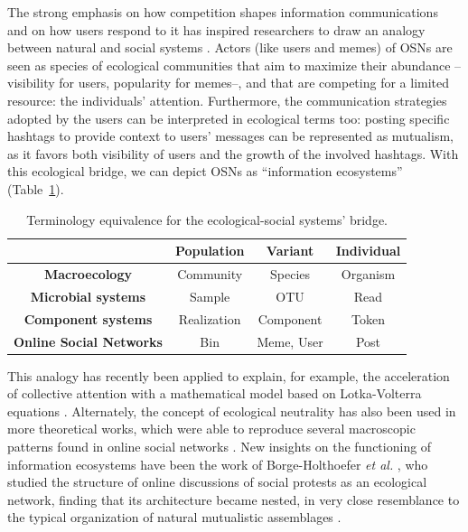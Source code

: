 The strong emphasis on how competition shapes information communications and on how users respond to it has inspired researchers to draw an analogy between natural and social systems \cite{borge2017emergence,lorenz2019accelerating,palazzi2021ecological,plata2021neutral,calleja2021quantifying,tovo2021upscaling}. Actors (like users and memes) of OSNs are seen as species of ecological communities that aim to maximize their abundance --visibility for users, popularity for memes--, and that are competing for a limited resource: the individuals' attention. Furthermore, the communication strategies adopted by the users can be interpreted in ecological terms too: posting specific hashtags to provide context to users' messages can be represented as mutualism, as it favors both visibility of users and the growth of the involved hashtags. With this ecological bridge, we can depict OSNs as ``information ecosystems'' (Table~\ref{tab:bridge}).\\

\begin{table}[t]
\caption[Ecology-Social networks bridge]{Terminology equivalence for the ecological-social systems' bridge.}
\centering
\footnotesize
\begin{tabular}{cccc}
\hline
                    & \textbf{Population}   & \textbf{Variant}        & \textbf{Individual} \\ \hline \hline
\textbf{Macroecology}                & Community    & Species        & Organism   \\ \hline
\textbf{Microbial systems} & Sample       & OTU            & Read       \\ \hline
\textbf{Component systems}           & Realization  & Component      & Token      \\ \hline
\textbf{Online Social Networks}      & Bin & Meme, User  & Post   \\ \hline
\end{tabular} \label{tab:bridge}
\end{table}

This analogy has recently been applied to explain, for example, the acceleration of collective attention with a mathematical model based on Lotka-Volterra equations \cite{lorenz2019accelerating}. Alternately, the concept of ecological neutrality \cite{hubbell2001unified,azaele2016neutral} has also been used in more theoretical works, which were able to reproduce several macroscopic patterns found in online social networks \cite{plata2021neutral}. New insights on the functioning of information ecosystems have been the work of Borge-Holthoefer {\it et al.} \cite{borge2017emergence}, who studied the structure of online discussions of social protests as an ecological network, finding that its architecture became nested, in very close resemblance to the typical organization of natural mutualistic assemblages \cite{bascompte2003nested,bastolla2009mutualism}.\\

